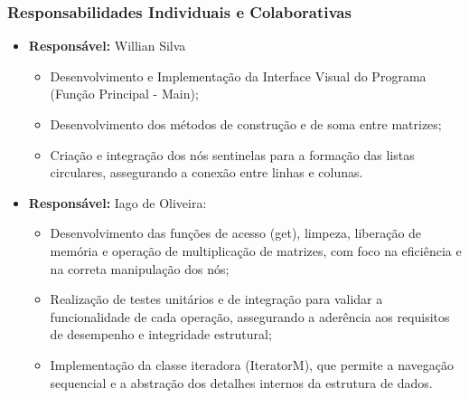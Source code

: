 \documentclass[12pt]{article}
\begin{document}
    \subsubsection{Responsabilidades Individuais e Colaborativas}
    \begin{itemize}
        \item \textbf{Responsável:} Willian Silva
            \begin{itemize}
                \item Desenvolvimento e Implementação da Interface Visual do Programa (Função Principal - Main);
                \item Desenvolvimento dos métodos de construção e de soma entre matrizes;
                \item Criação e integração dos nós sentinelas para a formação das listas circulares, assegurando a conexão entre linhas e colunas.
            \end{itemize}

        \item \textbf{Responsável:} Iago de Oliveira:
            \begin{itemize}
                \item Desenvolvimento das funções de acesso (get), limpeza, liberação de memória e operação de multiplicação de matrizes, com foco na eficiência e na correta manipulação dos nós;
                \item Realização de testes unitários e de integração para validar a funcionalidade de cada operação, assegurando a aderência aos requisitos de desempenho e integridade estrutural;
                \item Implementação da classe iteradora (IteratorM), que permite a navegação sequencial e a abstração dos detalhes internos da estrutura de dados.
            \end{itemize}


\end{itemize}
\end{document}
